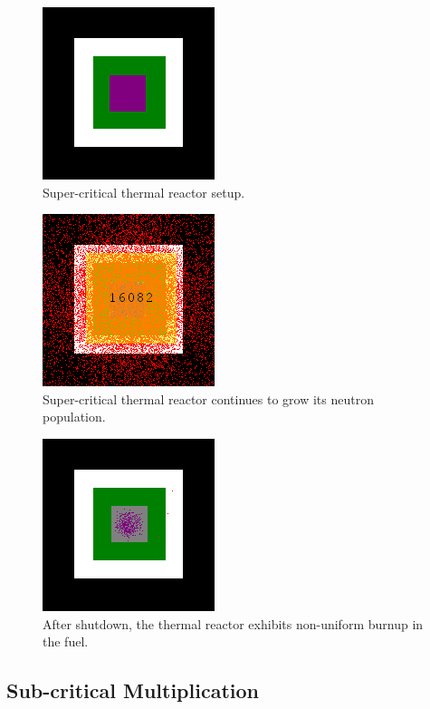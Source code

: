 \documentclass{anstrans}
\begin{document}
\begin{figure}
    \centering
    \includegraphics{reactor-thermal-setup.png}
    \caption{Super-critical thermal reactor setup.}
    \label{fig:thermal-setup}
\end{figure}
\begin{figure}
    \centering
    \includegraphics{reactor-thermal-1min.png}
    \caption{Super-critical thermal reactor continues to grow its neutron population. }
    \label{fig:thermal-on}
\end{figure}
\begin{figure}
    \centering
    \includegraphics{reactor-thermal-after.png}
    \caption{After shutdown, the thermal reactor exhibits non-uniform burnup in the fuel. }
    \label{fig:thermal-after}
\end{figure}

\subsection{Sub-critical Multiplication}
\end{document}
